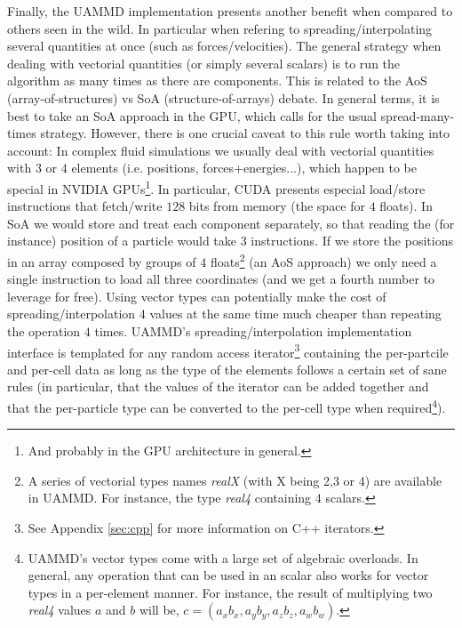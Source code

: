 \documentclass[ twoside,openright,titlepage,numbers=noenddot,%
headinclude,footinclude,cleardoublepage=empty,abstract=on,
BCOR=5mm,paper=a4,fontsize=11pt, dvipsnames
]{scrreprt}
\newcommand{\uammd}{\gls{UAMMD}\xspace}
\begin{document}
Finally, the \uammd implementation presents another benefit when compared to others seen in the wild. In particular when refering to spreading/interpolating several quantities at once (such as forces/velocities). The general strategy when dealing with vectorial quantities (or simply several scalars) is to run the algorithm as many times as there are components. This is related to the AoS (array-of-structures) vs SoA (structure-of-arrays) debate. In general terms, it is best to take an SoA approach in the GPU, which calls for the usual spread-many-times strategy. However, there is one crucial caveat to this rule worth taking into account: In complex fluid simulations we usually deal with vectorial quantities with $3$ or $4$ elements (i.e. positions, forces+energies...), which happen to be special in NVIDIA GPUs\footnote{And probably in the GPU architecture in general.}. In particular, CUDA presents especial load/store instructions that fetch/write $128$ bits from memory (the space for $4$ floats). In SoA we would store and treat each component separately, so that reading the (for instance) position of a particle would take $3$ instructions. If we store the positions in an array composed by groups of $4$ floats\footnote{A series of vectorial types names \emph{realX} (with X being 2,3 or 4) are available in \uammd. For instance, the type \emph{real4} containing $4$ scalars.} (an AoS approach) we only need a single instruction to load all three coordinates (and we get a fourth number to leverage for free). Using vector types can potentially make the cost of spreading/interpolation $4$ values at the same time much cheaper than repeating the operation $4$ times. \uammd's spreading/interpolation implementation interface is templated for any random access iterator\footnote{See Appendix \ref{sec:cpp} for more information on C++ iterators.} containing the per-partcile and per-cell data as long as the type of the elements follows a certain set of sane rules (in particular, that the values of the iterator can be added together and that the per-particle type can be converted to the per-cell type when required\footnote{\uammd's vector types come with a large set of algebraic overloads. In general, any operation that can be used in an scalar also works for vector types in a per-element manner. For instance, the result of multiplying two \emph{real4} values $a$ and $b$ will be, $c = (a_xb_x, a_yb_y, a_zb_z, a_wb_w)$.}).
\end{document}
